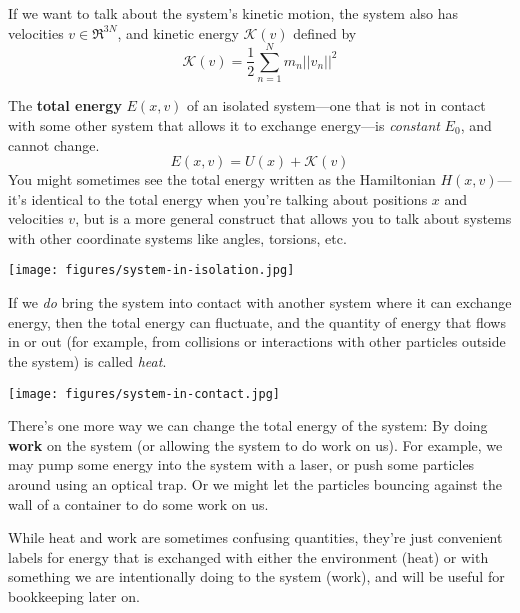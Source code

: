 \documentclass[english,course]{lecture}
\begin{document}
If we want to talk about the system's kinetic motion, the system also has velocities $v \in \Re^{3N}$, and kinetic energy $\mathcal{K}(v)$ defined by
\begin{equation}
\mathcal{K}(v) = \frac{1}{2} \sum_{n=1}^N m_n ||v_n||^2
\end{equation}

The {\bf total energy} $E(x,v)$ of an isolated system---one that is not in contact with some other system that allows it to exchange energy---is \emph{constant} $E_0$, and cannot change.
\begin{equation}
E(x,v) = U(x) + \mathcal{K}(v) \label{equation:total-energy}
\end{equation}
You might sometimes see the total energy written as the Hamiltonian $H(x,v)$---it's identical to the total energy when you're talking about positions $x$ and velocities $v$, but is a more general construct that allows you to talk about systems with other coordinate systems like angles, torsions, etc.

\begin{centering}
\texttt{[image: figures/system-in-isolation.jpg]}

\end{centering}

If we \emph{do} bring the system into contact with another system where it can exchange energy, then the total energy can fluctuate, and the quantity of energy that flows in or out (for example, from collisions or interactions with other particles outside the system) is called \emph{heat}.

\begin{centering}
\texttt{[image: figures/system-in-contact.jpg]}

\end{centering}

There's one more way we can change the total energy of the system: By doing {\bf work} on the system (or allowing the system to do work on us).
For example, we may pump some energy into the system with a laser, or push some particles around using an optical trap.
Or we might let the particles bouncing against the wall of a container to do some work on us.

While heat and work are sometimes confusing quantities, they're just convenient labels for energy that is exchanged with either the environment (heat) or with something we are intentionally doing to the system (work), and will be useful for bookkeeping later on.
\end{document}

